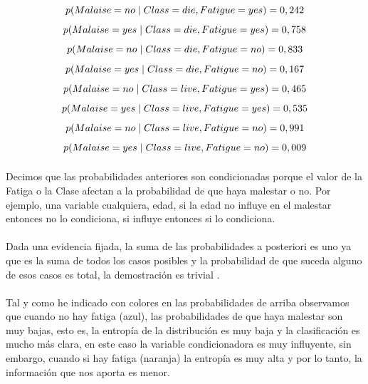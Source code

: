 \documentclass[es]{ifirak}
\begin{document}
$$p (Malaise=no \hspace{0.1cm}|\hspace{0.1cm} Class=die , Fatigue=yes) = 0,242$$
$$p (Malaise=yes \hspace{0.1cm}|\hspace{0.1cm}Class=die , Fatigue=yes) = 0,758$$
$$p (Malaise=no \hspace{0.1cm}|\hspace{0.1cm} Class=die , Fatigue=no) = 0,833$$
$$p (Malaise=yes \hspace{0.1cm}|\hspace{0.1cm} Class=die , Fatigue=no) = 0,167$$
$$p (Malaise=no \hspace{0.1cm}|\hspace{0.1cm} Class= live , Fatigue=yes) = 0,465$$
$$p (Malaise=yes \hspace{0.1cm}|\hspace{0.1cm} Class= live , Fatigue=yes) = 0,535$$
$$p (Malaise=no \hspace{0.1cm}|\hspace{0.1cm} Class= live , Fatigue=no) = 0,991$$
$$p (Malaise=yes \hspace{0.1cm}|\hspace{0.1cm} Class= live , Fatigue=no) = 0,009$$
\paragraph{}
Decimos que las probabilidades anteriores son condicionadas porque el valor de la  Fatiga o la Clase afectan a la probabilidad de que haya malestar o no. Por ejemplo, una variable cualquiera, edad, si la edad no influye en el malestar entonces no lo condiciona, si influye entonces si lo condiciona.
\paragraph{}
Dada una evidencia fijada, la suma de las probabilidades a posteriori es uno ya que es la suma de todos los casos posibles y la probabilidad de que suceda alguno  de esos casos es total, la demostración es trivial . 
\paragraph{}
Tal y como he indicado con colores en las probabilidades de arriba observamos que cuando no hay fatiga (azul), las probabilidades de que haya malestar son muy bajas, esto es, la entropía de la distribución es muy baja y la clasificación es mucho más clara, en este caso la variable condicionadora es muy influyente, sin embargo, cuando si hay fatiga (naranja) la entropía es muy alta y por lo tanto, la información que nos aporta es menor.
\end{document}
